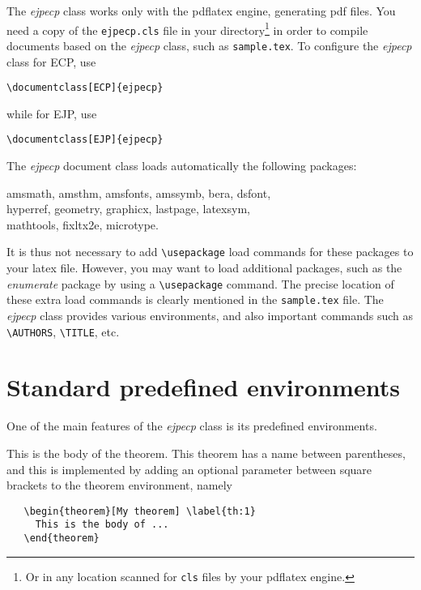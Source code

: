 \documentclass[ECP]{ejpecp} %
\begin{document}
The \emph{ejpecp} class works only with the pdflatex engine, generating pdf
files. You need a copy of the \texttt{ejpecp.cls} file in your
directory\footnote{Or in any location scanned for \texttt{cls} files by your
  pdflatex engine.} in order to compile documents based on the \emph{ejpecp}
class, such as \texttt{sample.tex}. To configure the \emph{ejpecp} class for
ECP, use
\begin{verbatim}
\documentclass[ECP]{ejpecp}
\end{verbatim}
while for EJP, use
\begin{verbatim}
\documentclass[EJP]{ejpecp}
\end{verbatim}
The \emph{ejpecp} document class loads automatically the following packages:
\begin{center}
  \ttfamily
  amsmath, amsthm, amsfonts, amssymb, bera, dsfont, \\
  hyperref, geometry, graphicx, lastpage, latexsym, \\
  mathtools, fixltx2e, microtype.
\end{center}
It is thus not necessary to add \verb+\usepackage+ load commands for
these packages to your latex file. However, you may want to load additional
packages, such as the \emph{enumerate} package by using a \verb+\usepackage+
command. The precise location of these extra load commands is clearly
mentioned in the \texttt{sample.tex} file. The \emph{ejpecp} class provides
various environments, and also important commands such as \verb+\AUTHORS+,
\verb+\TITLE+, etc.
 
\section{Standard predefined environments}

One of the main features of the \emph{ejpecp} class is its predefined
environments.

 \begin{theorem}[My theorem]\label{th:1}
   This is the body of the theorem. This theorem has a name between
   parentheses, and this is implemented by adding an optional parameter
   between square brackets to the theorem environment, namely
\begin{verbatim}
   \begin{theorem}[My theorem] \label{th:1}
     This is the body of ...
   \end{theorem}
\end{verbatim}
 \end{theorem}
\end{document}
